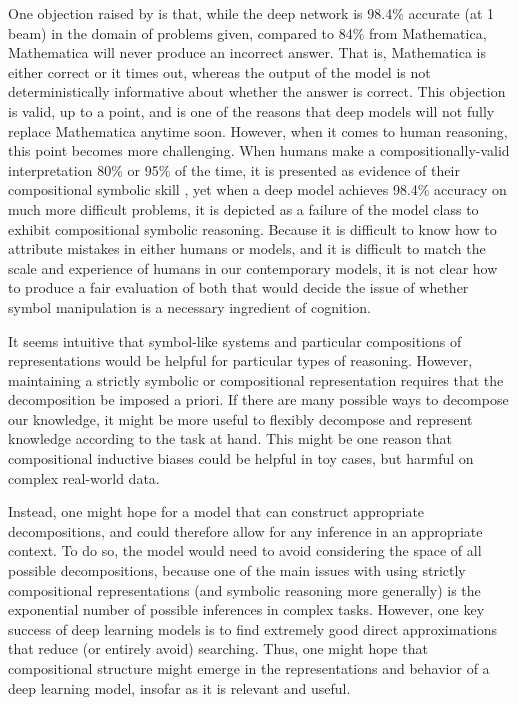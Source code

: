 One objection raised by \citet{Davis2019} is that, while the deep network is 98.4\% accurate (at 1 beam) in the domain of problems given, compared to 84\% from Mathematica, Mathematica will never produce an incorrect answer. That is, Mathematica is either correct or it times out, whereas the output of the model is not deterministically informative about whether the answer is correct. This objection is valid, up to a point, and is one of the reasons that deep models will not fully replace Mathematica anytime soon. However, when it comes to human reasoning, this point becomes more challenging. When humans make a compositionally-valid interpretation 80\% or 95\% of the time, it is presented as evidence of their compositional symbolic skill \citep{Lake2019a}, yet when a deep model achieves 98.4\% accuracy on much more difficult problems, it is depicted as a failure of the model class to exhibit compositional symbolic reasoning. Because it is difficult to know how to attribute mistakes in either humans or models, and it is difficult to match the scale and experience of humans in our contemporary models, it is not clear how to produce a fair evaluation of both that would decide the issue of whether symbol manipulation is a necessary ingredient of cognition. \par 
It seems intuitive that symbol-like systems and particular compositions of representations would be helpful for particular types of reasoning. However, maintaining a strictly symbolic or compositional representation requires that the decomposition be imposed a priori. If there are many possible ways to decompose our knowledge, it might be more useful to flexibly decompose and represent knowledge according to the task at hand. This might be one reason that compositional inductive biases could be helpful in toy cases, but harmful on complex real-world data.\par
Instead, one might hope for a model that can construct appropriate decompositions, and could therefore allow for any inference in an appropriate context. To do so, the model would need to avoid considering the space of all possible decompositions, because one of the main issues with using strictly compositional representations (and symbolic reasoning more generally) is the exponential number of possible inferences in complex tasks. However, one key success of deep learning models is to find extremely good direct approximations that reduce (or entirely avoid) searching. Thus, one might hope that compositional structure might emerge in the representations and behavior of a deep learning model, insofar as it is relevant and useful.\par 

